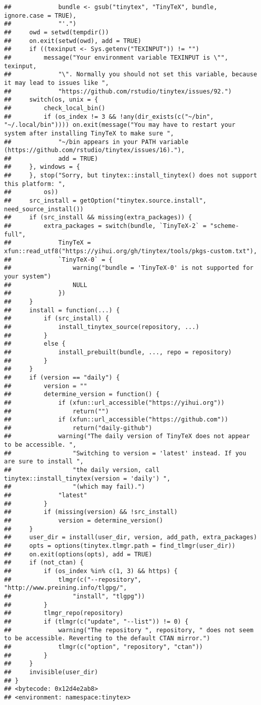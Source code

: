 \documentclass[
]{article}
\begin{document}
\begin{verbatim}
##             bundle <- gsub("tinytex", "TinyTeX", bundle, ignore.case = TRUE), 
##             "'.")
##     owd = setwd(tempdir())
##     on.exit(setwd(owd), add = TRUE)
##     if ((texinput <- Sys.getenv("TEXINPUT")) != "") 
##         message("Your environment variable TEXINPUT is \"", texinput, 
##             "\". Normally you should not set this variable, because it may lead to issues like ", 
##             "https://github.com/rstudio/tinytex/issues/92.")
##     switch(os, unix = {
##         check_local_bin()
##         if (os_index != 3 && !any(dir_exists(c("~/bin", "~/.local/bin")))) on.exit(message("You may have to restart your system after installing TinyTeX to make sure ", 
##             "~/bin appears in your PATH variable (https://github.com/rstudio/tinytex/issues/16)."), 
##             add = TRUE)
##     }, windows = {
##     }, stop("Sorry, but tinytex::install_tinytex() does not support this platform: ", 
##         os))
##     src_install = getOption("tinytex.source.install", need_source_install())
##     if (src_install && missing(extra_packages)) {
##         extra_packages = switch(bundle, `TinyTeX-2` = "scheme-full", 
##             TinyTeX = xfun::read_utf8("https://yihui.org/gh/tinytex/tools/pkgs-custom.txt"), 
##             `TinyTeX-0` = {
##                 warning("bundle = 'TinyTeX-0' is not supported for your system")
##                 NULL
##             })
##     }
##     install = function(...) {
##         if (src_install) {
##             install_tinytex_source(repository, ...)
##         }
##         else {
##             install_prebuilt(bundle, ..., repo = repository)
##         }
##     }
##     if (version == "daily") {
##         version = ""
##         determine_version = function() {
##             if (xfun::url_accessible("https://yihui.org")) 
##                 return("")
##             if (xfun::url_accessible("https://github.com")) 
##                 return("daily-github")
##             warning("The daily version of TinyTeX does not appear to be accessible. ", 
##                 "Switching to version = 'latest' instead. If you are sure to install ", 
##                 "the daily version, call tinytex::install_tinytex(version = 'daily') ", 
##                 "(which may fail).")
##             "latest"
##         }
##         if (missing(version) && !src_install) 
##             version = determine_version()
##     }
##     user_dir = install(user_dir, version, add_path, extra_packages)
##     opts = options(tinytex.tlmgr.path = find_tlmgr(user_dir))
##     on.exit(options(opts), add = TRUE)
##     if (not_ctan) {
##         if (os_index %in% c(1, 3) && https) {
##             tlmgr(c("--repository", "http://www.preining.info/tlgpg/", 
##                 "install", "tlgpg"))
##         }
##         tlmgr_repo(repository)
##         if (tlmgr(c("update", "--list")) != 0) {
##             warning("The repository ", repository, " does not seem to be accessible. Reverting to the default CTAN mirror.")
##             tlmgr(c("option", "repository", "ctan"))
##         }
##     }
##     invisible(user_dir)
## }
## <bytecode: 0x12d4e2ab8>
## <environment: namespace:tinytex>
\end{verbatim}
\end{document}
